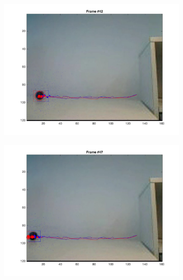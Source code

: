 \documentclass{ethz_report}
\begin{document}
\begin{figure}[h]
\begin{subfigure}[b]{.25\textwidth}
        \includegraphics[width=1\linewidth]{images/video3_particles_high_41}
    \end{subfigure}%
    \begin{subfigure}[b]{.25\textwidth}
        \centering
        \includegraphics[width=1\linewidth]{images/video3_particles_high_46}
    \end{subfigure}%
    \begin{subfigure}[b]{.25\textwidth}
        \centering

\end{subfigure}
\end{figure}
\end{document}
